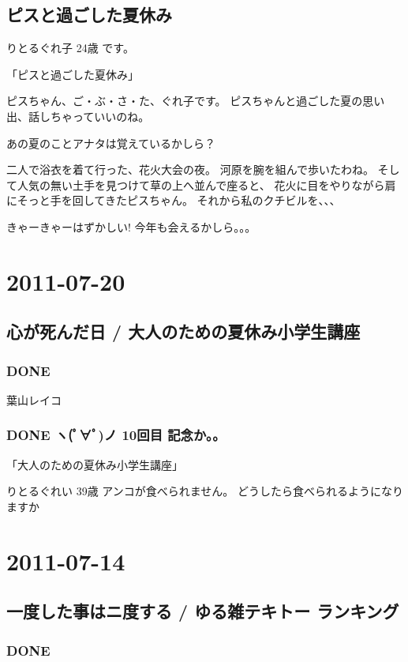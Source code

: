 \documentclass[11pt]{article}
\begin{document}
\subsection{ピスと過ごした夏休み}
\label{sec-92_1}

りとるぐれ子 24歳 です。

「ピスと過ごした夏休み」

ピスちゃん、ご・ぶ・さ・た、ぐれ子です。
ピスちゃんと過ごした夏の思い出、話しちゃっていいのね。

あの夏のことアナタは覚えているかしら？

二人で浴衣を着て行った、花火大会の夜。
河原を腕を組んで歩いたわね。
そして人気の無い土手を見つけて草の上へ並んで座ると、
花火に目をやりながら肩にそっと手を回してきたピスちゃん。
それから私のクチビルを、、、

きゃーきゃーはずかしい!
今年も会えるかしら。。。
\section{2011-07-20}
\label{sec-93}
\subsection{心が死んだ日 / 大人のための夏休み小学生講座}
\label{sec-93_1}
\subsubsection{\textbf{DONE}}
\label{sec-93_1_1}

葉山レイコ
\subsubsection{\textbf{DONE} ヽ(ﾟ∀ﾟ)ノ 10回目 記念か。。}
\label{sec-93_1_2}

「大人のための夏休み小学生講座」

りとるぐれい 39歳
アンコが食べられません。
どうしたら食べられるようになりますか
\section{2011-07-14}
\label{sec-94}
\subsection{一度した事はニ度する / ゆる雑テキトー ランキング}
\label{sec-94_1}
\subsubsection{\textbf{DONE}}
\label{sec-94_1_1}
\end{document}
